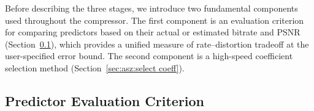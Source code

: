
Before describing the three stages, we introduce two fundamental components used throughout the compressor.
The first component is an evaluation criterion for comparing predictors based on their actual or estimated bitrate and PSNR (Section~\ref{sec:asz:evaluation}), which provides a unified measure of rate–distortion tradeoff at the user-specified error bound.
The second component is a high-speed coefficient selection method (Section~\ref{sec:asz:select coeff}).

\subsection{Predictor Evaluation Criterion}\label{sec:asz:evaluation}




